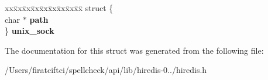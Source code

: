 \begin{DoxyCompactItemize}
\begin{tabbing}
\end{tabbing}\item 
\mbox{\label{structredis_context_aff2d9fc1e4dc37ac4d5aa0d743a05843}} 
\begin{tabbing}
xx\=xx\=xx\=xx\=xx\=xx\=xx\=xx\=xx\=\kill
struct \{\\
\>char $\ast$ {\bfseries path}\\
\} {\bfseries unix\_sock}\\

\end{tabbing}\end{DoxyCompactItemize}


The documentation for this struct was generated from the following file\+:\begin{DoxyCompactItemize}
\item 
/\+Users/firatciftci/spellcheck/api/lib/hiredis-\/0../hiredis.\+h\end{DoxyCompactItemize}
